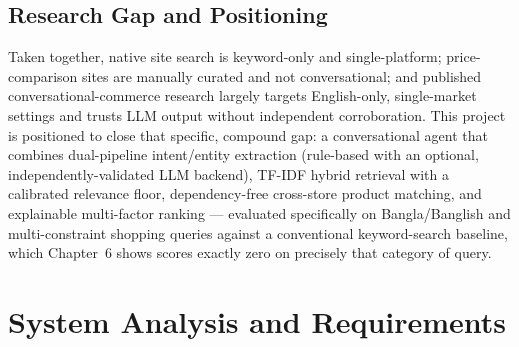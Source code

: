 \documentclass[12pt,a4paper]{report}
\begin{document}
\section{Research Gap and Positioning}
Taken together, native site search is keyword-only and single-platform; price-comparison sites are
manually curated and not conversational; and published conversational-commerce research largely targets
English-only, single-market settings and trusts LLM output without independent corroboration. This project
is positioned to close that specific, compound gap: a conversational agent that combines dual-pipeline
intent/entity extraction (rule-based with an optional, independently-validated LLM backend), TF-IDF hybrid
retrieval with a calibrated relevance floor, dependency-free cross-store product matching, and explainable
multi-factor ranking --- evaluated specifically on Bangla/Banglish and multi-constraint shopping queries
against a conventional keyword-search baseline, which Chapter~6 shows scores exactly zero on precisely
that category of query.

\chapter{System Analysis and Requirements}
\end{document}
